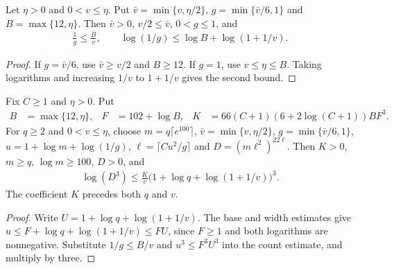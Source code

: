 \begin{theorem}
    \label{thm:capped_initial_filter_width}
    \leanok
    Let $\eta>0$ and $0<v\le\eta$. Put
    $\bar v=\min\{v,\eta/2\}$, $g=\min\{\bar v/6,1\}$ and
    $B=\max\{12,\eta\}$. Then $\bar v>0$, $v/2\le\bar v$,
    $0<g\le1$, and
    \begin{align*}
        \frac1g\le\frac Bv,
        \qquad\log(1/g)\le\log B+\log(1+1/v).
    \end{align*}
\end{theorem}
\begin{proof}\leanok
    If $g=\bar v/6$, use $\bar v\ge v/2$ and $B\ge12$.
    If $g=1$, use $v\le\eta\le B$.
    Taking logarithms and increasing $1/v$ to $1+1/v$ gives the second bound.
\end{proof}

\begin{theorem}
    \label{thm:initial_low_density_log_count}
    \leanok
    Fix $C\ge1$ and $\eta>0$. Put
    \begin{align*}
        B & =\max\{12,\eta\},           & F & =102+\log B, &
        K & =66(C+1)(6+2\log(C+1))BF^3.
    \end{align*}
    For $q\ge2$ and $0<v\le\eta$, choose $m=q\lceil e^{100}\rceil$,
    $\bar v=\min\{v,\eta/2\}$, $g=\min\{\bar v/6,1\}$,
    $u=1+\log m+\log(1/g)$, $\ell=\lceil Cu^2/g\rceil$ and
    $D=(m\ell^2)^{22\ell}$. Then $K>0$, $m\ge q$,
    $\log m\ge100$, $D>0$, and
    \begin{align*}
        \log(D^3)\le\frac Kv
        \bigl(1+\log q+\log(1+1/v)\bigr)^3.
    \end{align*}
    The coefficient $K$ precedes both $q$ and $v$.
\end{theorem}
\begin{proof}\leanok
    Write $U=1+\log q+\log(1+1/v)$. The base and width estimates give
    $u\le F+\log q+\log(1+1/v)\le FU$, since $F\ge1$ and both
    logarithms are nonnegative. Substitute $1/g\le B/v$ and $u^3\le F^3U^3$
    into the count estimate, and multiply by three.
\end{proof}


